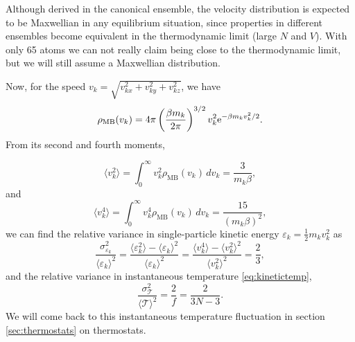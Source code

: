 \documentclass[11pt,bibliography=totoc,index=totoc]{scrbook}   %
\begin{document}
Although derived in the canonical ensemble, the velocity distribution is expected to be Maxwellian in any equilibrium situation, 
since properties in different ensembles become equivalent in the thermodynamic limit (large $N$ and $V$).\cite[65]{Haile:1992}
With only 65 atoms we can not really claim being close to the thermodynamic limit, but we will still assume a Maxwellian distribution.

Now, for the speed $v_k=\sqrt{v_{kx}^2+v_{ky}^2+v_{kz}^2}$, we have 
\begin{equation}
  \rho_{\text{MB}}(v_k) = 4\pi\left(\frac{\beta m_k}{2\pi }\right)^{3/2} v_k^2 \mathrm{e}^{-\beta m_k v_k^2 / 2}.
  \label{eq:maxboltz-vdist}
\end{equation}
From its second and fourth moments, %

\begin{equation}
  \langle v_k^2 \rangle = \int_0^{\infty} v_k^2 \rho_{\text{MB}}(v_k) \,dv_k = \frac{3}{m_k\beta},
\end{equation}
and
\begin{equation}
  \langle v_k^4 \rangle = \int_0^{\infty} v_k^4 \rho_{\text{MB}}(v_k) \,dv_k = \frac{15}{(m_k\beta)^2},
\end{equation}
we can find the relative variance in single-particle kinetic energy $\varepsilon_k = \frac12 m_k v_k^2$ as
\begin{equation}
  \frac{\sigma_{\varepsilon_k}^2}{\langle \varepsilon_k \rangle^2} 
  = \frac{\langle \varepsilon_k^2 \rangle - \langle \varepsilon_k \rangle^2}{ \langle \varepsilon_k \rangle^2 }
  = \frac{\langle v_k^4 \rangle - \langle v_k^2 \rangle^2}{ \langle v_k^2 \rangle^2 }
  = \frac{2}{3},
\end{equation}
and the relative variance in instantaneous temperature \eqref{eq:kinetictemp},\cite[127]{Frenkel:1996}
\begin{equation}
    \frac{\sigma_{\mathcal{T}}^2}{\langle \mathcal{T} \rangle^2} = \frac{2}{f} = \frac{2}{3N-3}.
  \label{eq:tempvar}
\end{equation}
We will come back to this instantaneous temperature fluctuation in section \ref{sec:thermostats} on thermostats.
\end{document}
